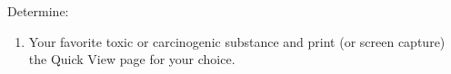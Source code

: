 \documentclass[12pt]{article}
\begin{document}
\begin{enumerate}
Determine:
\begin{enumerate} %
\item Your favorite toxic or carcinogenic substance and print (or screen capture) the Quick View page for your choice.
\end{enumerate} %

\end{enumerate}%
\end{document}
